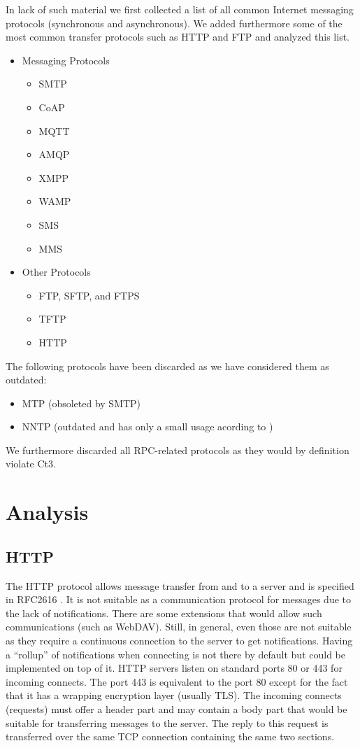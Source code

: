 In lack of such material we first collected a list of all common Internet messaging protocols (synchronous and asynchronous). We added furthermore some of the most common transfer protocols such as HTTP and FTP and analyzed this list.

\begin{itemize}
	\item Messaging Protocols
	\begin{itemize}
		\item SMTP
		\item CoAP
		\item MQTT
		\item AMQP
		\item XMPP
		\item WAMP
		\item SMS
		\item MMS
	\end{itemize}
	\item Other Protocols
	\begin{itemize}
		\item FTP, SFTP, and FTPS
		\item TFTP
		\item HTTP
	\end{itemize}
\end{itemize}

The following protocols have been discarded as we have considered them as outdated:
\begin{itemize}
	\item MTP\cite{RFC780} (obsoleted by SMTP)
	\item NNTP\cite{RFC3977} (outdated and has only a small usage acording to \cite{kim2010today})
\end{itemize}

We furthermore discarded all RPC-related protocols as they would by definition violate Ct3.

\section{Analysis}
\subsection{HTTP}
The HTTP protocol allows message transfer from and to a server and is specified in RFC2616 \cite{rfc2616}. It is not suitable as a communication protocol for messages due to the lack of notifications. There are some extensions that would allow such communications (such as WebDAV). Still, in general, even those are not suitable as they require a continuous connection to the server to get notifications. Having a ``rollup'' of notifications when connecting is not there by default but could be implemented on top of it. HTTP servers listen on standard ports 80 or 443 for incoming connects. The port 443 is equivalent to the port 80 except for the fact that it has a wrapping encryption layer (usually TLS). The incoming connects (requests) must offer a header part and may contain a body part that would be suitable for transferring messages to the server. The reply to this request is transferred over the same TCP connection containing the same two sections.

